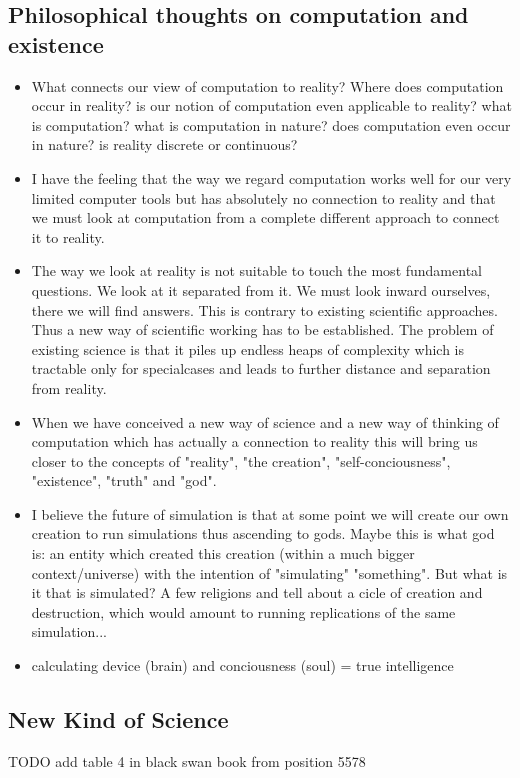 \documentclass{article}
\begin{document}
\subsection{Philosophical thoughts on computation and existence}
\begin{itemize}
\item What connects our view of computation to reality? Where does computation occur in reality? is our notion of computation even applicable to reality? what is computation? what is computation in nature? does computation even occur in nature? is reality discrete or continuous?
\item I have the feeling that the way we regard computation works well for our very limited computer tools but has absolutely no connection to reality and that we must look at computation from a complete different approach to connect it to reality.
\item The way we look at reality is not suitable to touch the most fundamental questions. We look at it separated from it. We must look inward ourselves, there we will find answers. This is contrary to existing scientific approaches. Thus a new way of scientific working has to be established. The problem of existing science is that it piles up endless heaps of complexity which is tractable only for specialcases and leads to further distance and separation from reality.
\item When we have conceived a new way of science and a new way of thinking of computation which has actually a connection to reality this will bring us closer to the concepts of "reality", "the creation", "self-conciousness", "existence", "truth" and "god".
\item I believe the future of simulation is that at some point we will create our own creation to run simulations thus ascending to gods. Maybe this is what god is: an entity which created this creation (within a much bigger context/universe) with the intention of "simulating" "something". But what is it that is simulated? A few religions and tell about a cicle of creation and destruction, which would amount to running replications of the same simulation... 
\item calculating device (brain) and conciousness (soul) = true intelligence
\end{itemize}


\subsection{New Kind of Science}
TODO add table 4 in black swan book from position 5578
\end{document}

